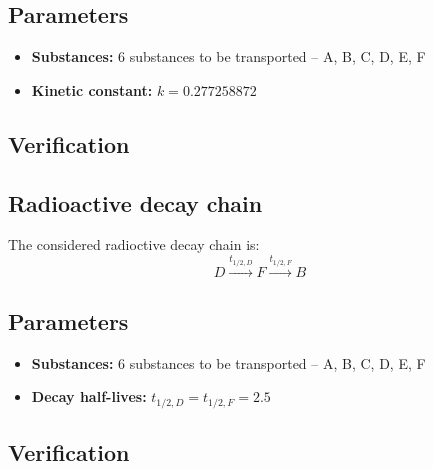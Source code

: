 \subsection*{Parameters}
\begin{itemize}
  \item \textbf{Substances:} 6 substances to be transported -- A, B, C, D, E, F
  \item \textbf{Kinetic constant:} $k = 0.277258872$
\end{itemize}

\subsection*{Verification}

\subsection{Radioactive decay chain}
The considered radioctive decay chain is:
\[
 D\xrightarrow{t_{1/2,D}}F\xrightarrow{t_{1/2,F}}B
\]
\subsection*{Parameters}
\begin{itemize}
  \item \textbf{Substances:} 6 substances to be transported -- A, B, C, D, E, F
  \item \textbf{Decay half-lives:} $t_{1/2,D} = t_{1/2,F} = 2.5$
\end{itemize}

\subsection*{Verification}


